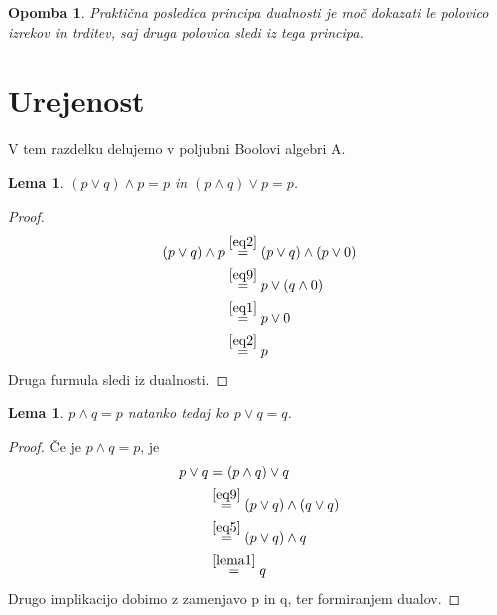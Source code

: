 \documentclass{amsart}
\newtheorem{lema}[izrek]{Lema}
\newtheorem{opomba}[izrek]{Opomba}
\begin{document}
\begin{opomba}
    Praktična posledica principa dualnosti je moč dokazati le polovico izrekov in trditev, 
    saj druga polovica sledi iz tega principa.
\end{opomba}

\section{Urejenost}

V tem razdelku delujemo v poljubni Boolovi algebri A.

\begin{lema}
    \label{lema1}
    \(\left(p \vee q\right) \wedge p = p\) in \(\left(p \wedge q\right) \vee p = p\).
\end{lema}

\begin{proof} 
    \begin{align*}
        \left(p \vee q\right) \wedge p &\stackrel{\ref{eq2}}{=} \left(p \vee q\right) \wedge \left(p \vee 0 \right) \\
                    &\stackrel{\ref{eq9}}{=} p \vee \left(q \wedge 0\right)\\
                    &\stackrel{\ref{eq1}}{=} p \vee 0\\
                    &\stackrel{\ref{eq2}}{=} p 
    \end{align*}
    Druga furmula sledi iz dualnosti.

\end{proof}


\begin{lema}
    \label{lema2}
    \(p \wedge q = p\) natanko tedaj ko \(p \vee q = q\).
\end{lema}

\begin{proof}
    Če je \(p \wedge q = p\), je 
    \begin{align*}
        p \vee q &\stackrel{}{=} \left(p \wedge q\right) \vee q \\
                    &\stackrel{\ref{eq9}}{=} \left(p \vee q\right) \wedge \left(q \vee q\right) \\
                    &\stackrel{\ref{eq5}}{=} \left(p \vee q\right) \wedge q\\
                    &\stackrel{\ref{lema1}}{=} q 
    \end{align*}
    Drugo implikacijo dobimo z zamenjavo p in q, ter formiranjem dualov.
\end{proof}
\end{document}
